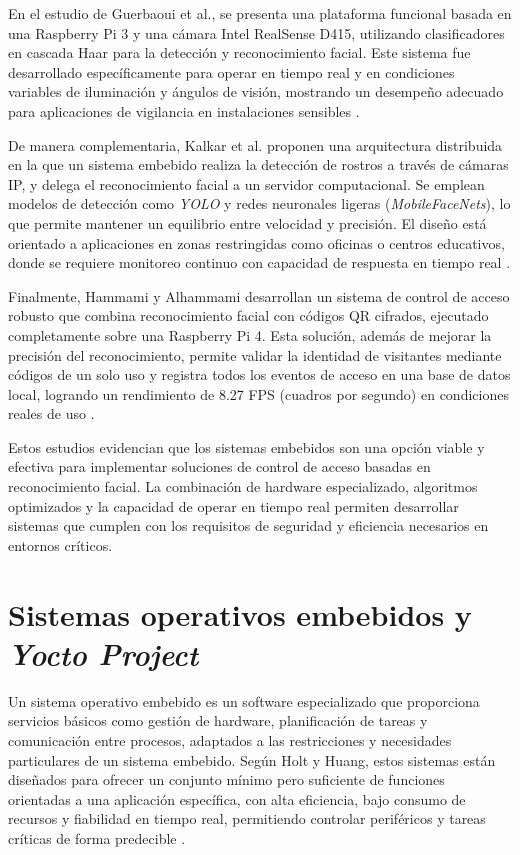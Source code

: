 En el estudio de Guerbaoui et al., se presenta una plataforma funcional basada en una Raspberry Pi 3 y una cámara Intel RealSense D415, utilizando clasificadores en cascada Haar para la detección y reconocimiento facial. Este sistema fue desarrollado específicamente para operar en tiempo real y en condiciones variables de iluminación y ángulos de visión, mostrando un desempeño adecuado para aplicaciones de vigilancia en instalaciones sensibles \cite{guerbaoui_2025}.

De manera complementaria, Kalkar et al. proponen una arquitectura distribuida en la que un sistema embebido realiza la detección de rostros a través de cámaras IP, y delega el reconocimiento facial a un servidor computacional. Se emplean modelos de detección como \textit{YOLO} y redes neuronales ligeras (\textit{MobileFaceNets}), lo que permite mantener un equilibrio entre velocidad y precisión. El diseño está orientado a aplicaciones en zonas restringidas como oficinas o centros educativos, donde se requiere monitoreo continuo con capacidad de respuesta en tiempo real \cite{kalkar_2020}.

Finalmente, Hammami y Alhammami desarrollan un sistema de control de acceso robusto que combina reconocimiento facial con códigos QR cifrados, ejecutado completamente sobre una Raspberry Pi 4. Esta solución, además de mejorar la precisión del reconocimiento, permite validar la identidad de visitantes mediante códigos de un solo uso y registra todos los eventos de acceso en una base de datos local, logrando un rendimiento de 8.27 FPS (cuadros por segundo) en condiciones reales de uso \cite{hammami_2024}.

Estos estudios evidencian que los sistemas embebidos son una opción viable y efectiva para implementar soluciones de control de acceso basadas en reconocimiento facial. La combinación de hardware especializado, algoritmos optimizados y la capacidad de operar en tiempo real permiten desarrollar sistemas que cumplen con los requisitos de seguridad y eficiencia necesarios en entornos críticos.

\section{Sistemas operativos embebidos y \textit{Yocto Project}}


Un sistema operativo embebido es un software especializado que proporciona servicios básicos como gestión de hardware, planificación de tareas y comunicación entre procesos, adaptados a las restricciones y necesidades particulares de un sistema embebido. Según Holt y Huang, estos sistemas están diseñados para ofrecer un conjunto mínimo pero suficiente de funciones orientadas a una aplicación específica, con alta eficiencia, bajo consumo de recursos y fiabilidad en tiempo real, permitiendo controlar periféricos y tareas críticas de forma predecible \cite{holt_2018_embedded_os}.

